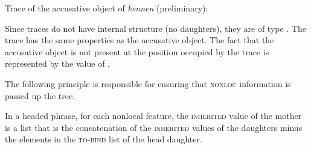 \eas
\label{le-spur-acc-o-kennen}
Trace of the accusative object of \emph{kennen} (preliminary):\\
\zs

\largerpage[2]
\noindent
Since traces do not have internal structure (no daughters), they are of type .
The trace has the same properties as the accusative object. The fact that the accusative object is not present at the position occupied by the trace
is represented by the value of \slasch. 
%

The following principle is responsible for ensuring that \textsc{nonloc} information is passed up the tree.

\begin{samepage}
\begin{principle-break}
\label{Prinzip-der-Nichtlokalen-Merkmale}
In a headed phrase, for each nonlocal feature, the \textsc{inherited} value of the mother is a list
that is the concatenation of the \textsc{inherited} values of the daughters minus the elements in the
\textsc{to-bind} list of the head daughter.
\end{principle-break}
\end{samepage}

